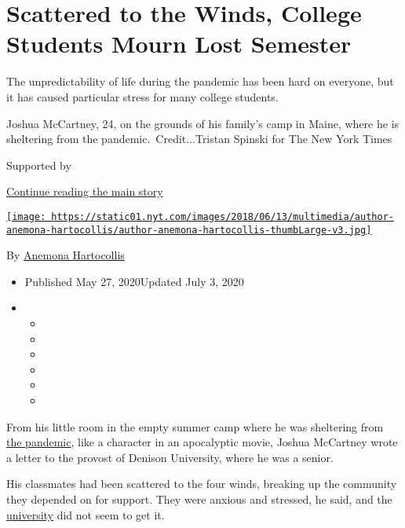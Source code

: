 \hypertarget{scattered-to-the-winds-college-students-mourn-lost-semester}{%
\section{Scattered to the Winds, College Students Mourn Lost
Semester}\label{scattered-to-the-winds-college-students-mourn-lost-semester}}

The unpredictability of life during the pandemic has been hard on
everyone, but it has caused particular stress for many college students.

Joshua McCartney, 24, on the grounds of his family's camp in Maine,
where he is sheltering from the pandemic.~Credit...Tristan Spinski for
The New York Times

Supported by

\protect\hyperlink{after-sponsor}{Continue reading the main story}

\href{https://www.nytimes.com/by/anemona-hartocollis}{\texttt{[image: https://static01.nyt.com/images/2018/06/13/multimedia/author-anemona-hartocollis/author-anemona-hartocollis-thumbLarge-v3.jpg]}}

By \href{https://www.nytimes.com/by/anemona-hartocollis}{Anemona
Hartocollis}

\begin{itemize}
\item
  Published May 27, 2020Updated July 3, 2020
\item
  \begin{itemize}
  \item
  \item
  \item
  \item
  \item
  \item
  \end{itemize}
\end{itemize}

From his little room in the empty summer camp where he was sheltering
from \href{https://www.nytimes.com/news-event/coronavirus}{the
pandemic}, like a character in an apocalyptic movie, Joshua McCartney
wrote a letter to the provost of Denison University, where he was a
senior.

His classmates had been scattered to the four winds, breaking up the
community they depended on for support. They were anxious and stressed,
he said, and the
\href{https://www.nytimes.com/2020/07/03/your-money/students-unemployment-insurance-coronavirus.html}{university}
did not seem to get it.

